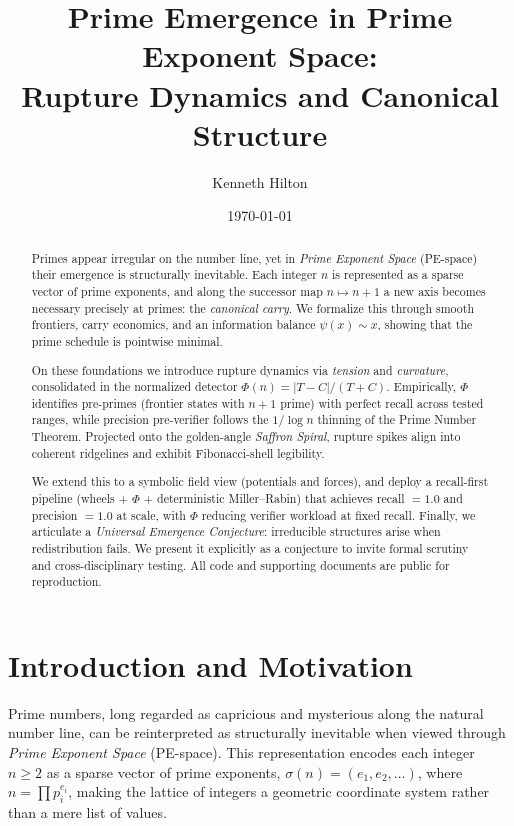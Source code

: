 \documentclass[11pt]{article}
\title{\Large Prime Emergence in Prime Exponent Space:\\
\large Rupture Dynamics and Canonical Structure}
\author{Kenneth Hilton}
\date{\today}
\theoremstyle{plain}
\theoremstyle{definition}
\begin{document}
\maketitle

\begin{abstract}
Primes appear irregular on the number line, yet in \emph{Prime Exponent Space} (PE-space) their emergence is structurally inevitable. Each integer $n$ is represented as a sparse vector of prime exponents, and along the successor map $n \mapsto n+1$ a new axis becomes necessary precisely at primes: the \emph{canonical carry}. We formalize this through smooth frontiers, carry economics, and an information balance $\psi(x)\sim x$, showing that the prime schedule is pointwise minimal.

On these foundations we introduce rupture dynamics via \emph{tension} and \emph{curvature}, consolidated in the normalized detector $\Phi(n)=\lvert T-C\rvert/(T+C)$. Empirically, $\Phi$ identifies pre-primes (frontier states with $n+1$ prime) with perfect recall across tested ranges, while precision pre-verifier follows the $1/\log n$ thinning of the Prime Number Theorem. Projected onto the golden-angle \emph{Saffron Spiral}, rupture spikes align into coherent ridgelines and exhibit Fibonacci-shell legibility.

We extend this to a symbolic field view (potentials and forces), and deploy a recall-first pipeline (wheels + $\Phi$ + deterministic Miller–Rabin) that achieves recall $=1.0$ and precision $=1.0$ at scale, with $\Phi$ reducing verifier workload at fixed recall. Finally, we articulate a \emph{Universal Emergence Conjecture}: irreducible structures arise when redistribution fails. We present it explicitly as a conjecture to invite formal scrutiny and cross-disciplinary testing. All code and supporting documents are public for reproduction.
\end{abstract}


\section{Introduction and Motivation}

Prime numbers, long regarded as capricious and mysterious along the natural number line, can be reinterpreted as structurally inevitable when viewed through \emph{Prime Exponent Space} (PE-space). This representation encodes each integer $n \geq 2$ as a sparse vector of prime exponents, $\sigma(n) = (e_1,e_2,\dots)$, where $n=\prod p_i^{e_i}$, making the lattice of integers a geometric coordinate system rather than a mere list of values.
\end{document}
